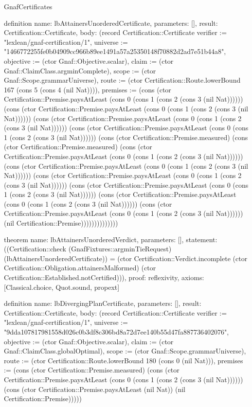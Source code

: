 \begin{lexlean}{GnafCertificates}
\begin{semanticmodule}
definition{
  name: lbAttainersUnorderedCertificate,
  parameters: [],
  result: Certification::Certificate,
  body: (record Certification::Certificate {verifier := "lexlean/gnaf-certification/1", universe := "1466772255fe0b04909cc966b89ee1491a57a25350148f70882d2ad7e51b44a8", objective := (ctor Gnaf::Objective.scalar), claim := (ctor Gnaf::ClaimClass.argminComplete), scope := (ctor Gnaf::Scope.grammarUniverse), route := (ctor Certification::Route.lowerBound 167 (cons 5 (cons 4 (nil Nat)))), premises := (cons (ctor Certification::Premise.paysAtLeast (cons 0 (cons 1 (cons 2 (cons 3 (nil Nat)))))) (cons (ctor Certification::Premise.paysAtLeast (cons 0 (cons 1 (cons 2 (cons 3 (nil Nat)))))) (cons (ctor Certification::Premise.paysAtLeast (cons 0 (cons 1 (cons 2 (cons 3 (nil Nat)))))) (cons (ctor Certification::Premise.paysAtLeast (cons 0 (cons 1 (cons 2 (cons 3 (nil Nat)))))) (cons (ctor Certification::Premise.measured) (cons (ctor Certification::Premise.measured) (cons (ctor Certification::Premise.paysAtLeast (cons 0 (cons 1 (cons 2 (cons 3 (nil Nat)))))) (cons (ctor Certification::Premise.paysAtLeast (cons 0 (cons 1 (cons 2 (cons 3 (nil Nat)))))) (cons (ctor Certification::Premise.paysAtLeast (cons 0 (cons 1 (cons 2 (cons 3 (nil Nat)))))) (cons (ctor Certification::Premise.paysAtLeast (cons 0 (cons 1 (cons 2 (cons 3 (nil Nat)))))) (cons (ctor Certification::Premise.paysAtLeast (cons 0 (cons 1 (cons 2 (cons 3 (nil Nat)))))) (cons (ctor Certification::Premise.paysAtLeast (cons 0 (cons 1 (cons 2 (cons 3 (nil Nat)))))) (nil Certification::Premise)))))))))))))})
}

theorem{
  name: lbAttainersUnorderedVerdict,
  parameters: [],
  statement: ((Certification::check (GnafFixtures::argminTieRequest) (lbAttainersUnorderedCertificate)) = (ctor Certification::Verdict.incomplete (ctor Certification::Obligation.attainersMalformed) (ctor Certification::Established.notCertified))),
  proof: reflexivity{},
  axioms: [Classical.choice, Quot.sound, propext]
}

definition{
  name: lbDivergingPlanCertificate,
  parameters: [],
  result: Certification::Certificate,
  body: (record Certification::Certificate {verifier := "lexlean/gnaf-certification/1", universe := "9dda107817981558d026c0b3df8c306bd8a72d7ee140b55d47fa887736402076", objective := (ctor Gnaf::Objective.scalar), claim := (ctor Gnaf::ClaimClass.globalOptimal), scope := (ctor Gnaf::Scope.grammarUniverse), route := (ctor Certification::Route.lowerBound 180 (cons 0 (nil Nat))), premises := (cons (ctor Certification::Premise.measured) (cons (ctor Certification::Premise.paysAtLeast (cons 0 (cons 1 (cons 2 (cons 3 (nil Nat)))))) (cons (ctor Certification::Premise.paysAtLeast (nil Nat)) (nil Certification::Premise))))})
}


\end{semanticmodule}
\end{lexlean}
